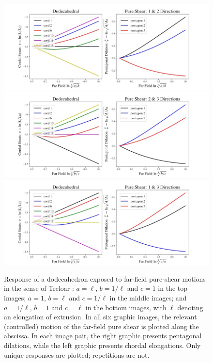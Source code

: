 \begin{figure}
	\centering
	\includegraphics[width=\textwidth]{figures/squeeze12.jpg} \\
	\includegraphics[width=\textwidth]{figures/squeeze23.jpg} \\
	\includegraphics[width=\textwidth]{figures/squeeze13.jpg} 
	\caption{Response of a dodecahedron exposed to far-field pure-shear motions in the sense of Treloar \cite{Treloar75}: $a = \ell$, $b = 1/\ell$ and $c = 1$ in the top images; $a = 1$, $b = \ell$ and $c = 1/\ell$ in the middle images; and $a = 1/\ell$, $b = 1$ and $c = \ell$ in the bottom images, with $\ell$ denoting an elongation of extrusion.  In all six graphic images, the relevant (controlled) motion of the far-field pure shear is plotted along the abscissa.  In each image pair, the right graphic presents pentagonal dilations, while the left graphic presents chordal elongations. Only unique responses are plotted; repetitions are not.}
	\label{figPureShears}
\end{figure}

